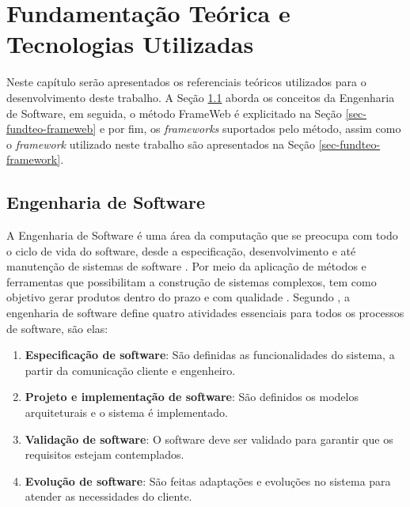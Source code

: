 \chapter{Fundamentação Teórica e Tecnologias Utilizadas}
\label{sec-fundteo}

Neste capítulo serão apresentados os referenciais teóricos utilizados para o desenvolvimento
deste trabalho. A Seção \ref{sec-fundteo-engsoft} aborda os conceitos da Engenharia de Software,
em seguida, o método FrameWeb é explicitado na Seção \ref{sec-fundteo-frameweb}
e por fim, os \textit{frameworks} suportados pelo método, assim como o \textit{framework}
utilizado neste trabalho são apresentados na Seção \ref{sec-fundteo-framework}.

\section{Engenharia de Software}
\label{sec-fundteo-engsoft}

A Engenharia de Software é uma área da computação que se preocupa com todo o ciclo de vida do software,
desde a especificação, desenvolvimento e até manutenção de sistemas de software \cite{sommerville:2011}.
Por meio da aplicação de métodos e ferramentas que possibilitam a construção de sistemas complexos,
tem como objetivo gerar produtos dentro do prazo e com qualidade \cite{pressman:2011}.
Segundo , a engenharia de software define quatro atividades
essenciais para todos os processos de software, são elas:


\begin{enumerate}
    \item \textbf{Especificação de software}: São definidas as funcionalidades do 
        sistema, a partir da comunicação cliente e engenheiro.
    \item \textbf{Projeto e implementação de software}: São definidos os modelos 
        arquiteturais e o sistema é implementado.
    \item \textbf{Validação de software}: O software deve ser validado para garantir 
        que os requisitos estejam contemplados.
    \item \textbf{Evolução de software}: São feitas adaptações e evoluções no sistema 
        para atender as necessidades do cliente.
\end{enumerate}

